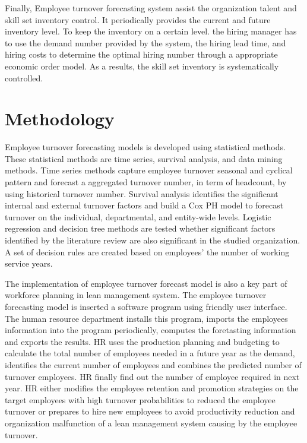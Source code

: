Finally, Employee turnover forecasting system assist the organization talent and skill set inventory control. It periodically provides the current and future inventory level. To keep the inventory on a certain level. the hiring manager has to use the demand number provided by the system, the hiring lead time, and hiring costs to determine the optimal hiring number through a appropriate economic order model. As a results, the skill set inventory is systematically controlled.


\section{Methodology}
Employee turnover forecasting models is developed using statistical methods. These statistical methods are time series, survival analysis, and data mining methods. Time series methods capture employee turnover seasonal and cyclical pattern and forecast a aggregated turnover number, in term of headcount, by using historical turnover number. Survival analysis identifies the significant internal and external turnover factors and build a Cox PH model to forecast turnover on the individual, departmental, and entity-wide levels. Logistic regression and decision tree methods are tested whether significant factors identified by the literature review are also significant in the studied organization. A set of decision rules are created based on employees' the number of working service years. 
   
The implementation of employee turnover forecast model is also a key part of workforce planning in lean management system. The employee turnover forecasting model is inserted a software program using friendly user interface. The human resource department installs this program, imports the employees information into the program periodically, computes the foretasting information and exports the results. HR uses the production planning and budgeting to calculate the total number of employees needed in a future year as the demand, identifies the current number of employees and combines the predicted number of turnover employees. HR finally find out the number of employee required in next year. 
HR either modifies the employee retention and promotion strategies on the target employees with high turnover probabilities to reduced the employee turnover or prepares to hire new employees to avoid productivity reduction and organization malfunction of a lean management system causing by the employee turnover.



